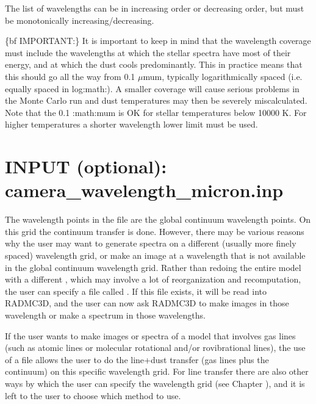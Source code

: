 \documentclass[letterpaper,10pt,english]{sphinxmanual}
\begin{document}
The list of wavelengths can be in increasing order or decreasing order, but
must be monotonically increasing/decreasing.

\{bf IMPORTANT:\} It is important to keep in mind that the wavelength
coverage must include the wavelengths at which the stellar spectra have most
of their energy, and at which the dust cools predominantly.  This in
practice means that this should go all the way from 0.1 \(\mu\)mu\textasciigrave{}m, typically logarithmically spaced (i.e. equally spaced in
log:math:). A smaller coverage will cause serious problems in the Monte
Carlo run and dust temperatures may then be severely miscalculated. Note
that the 0.1 :math:{\color{red}\bfseries{}\textasciigrave{}}mu\textasciigrave{}m is OK for stellar temperatures below 10000 K. For higher
temperatures a shorter wavelength lower limit must be used.


\section{INPUT (optional): camera\_wavelength\_micron.inp}
\label{\detokenize{inputoutputfiles:input-optional-camera-wavelength-micron-inp}}\label{\detokenize{inputoutputfiles:sec-camera-wavelengths}}
The wavelength points in the  file are the
global continuum wavelength points. On this grid the continuum transfer is
done. However, there may be various reasons why the user may want to
generate spectra on a different (usually more finely spaced) wavelength
grid, or make an image at a wavelength that is not available in the global
continuum wavelength grid. Rather than redoing the entire model with a
different , which may involve a lot of
reorganization and recomputation, the user can specify a file called . If this file exists, it will be read into
RADMC\sphinxhyphen{}3D, and the user can now ask RADMC\sphinxhyphen{}3D to make images in those
wavelength or make a spectrum in those wavelengths.

If the user wants to make images or spectra of a model that involves gas
lines (such as atomic lines or molecular rotational and/or ro\sphinxhyphen{}vibrational
lines), the use of a  file allows
the user to do the line+dust transfer (gas lines plus the continuum) on this
specific wavelength grid. For line transfer there are also other ways by
which the user can specify the wavelength grid (see Chapter
{\hyperref[\detokenize{lineradtrans:chap-line-transfer}]{}}), and it is left to the user to choose which method
to use.
\end{document}
